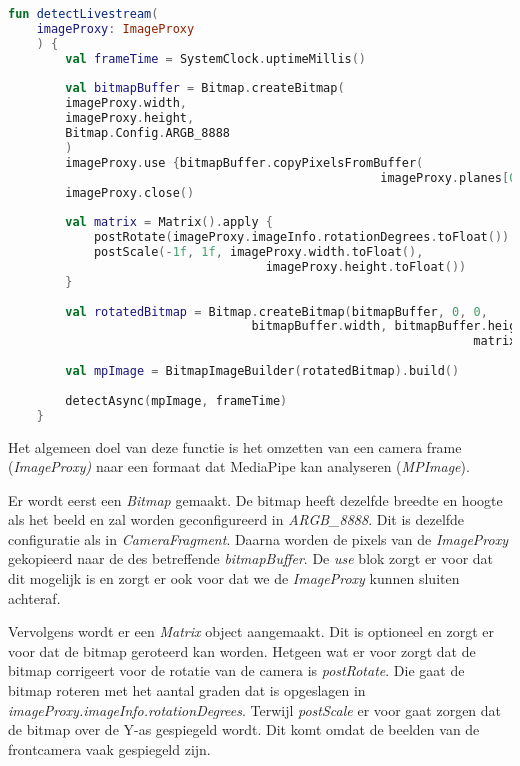 \begin{lstlisting}[language=Kotlin, caption=detectLivestream in FaceLandmarkerHelper.kt, label={lst:detectLivestream}]
    fun detectLivestream(
    imageProxy: ImageProxy
    ) {
        val frameTime = SystemClock.uptimeMillis()
        
        val bitmapBuffer = Bitmap.createBitmap(
        imageProxy.width,
        imageProxy.height,
        Bitmap.Config.ARGB_8888
        )
        imageProxy.use {bitmapBuffer.copyPixelsFromBuffer(
                                                    imageProxy.planes[0].buffer)}
        imageProxy.close()
        
        val matrix = Matrix().apply {
            postRotate(imageProxy.imageInfo.rotationDegrees.toFloat())
            postScale(-1f, 1f, imageProxy.width.toFloat(),
                                    imageProxy.height.toFloat())
        }
        
        val rotatedBitmap = Bitmap.createBitmap(bitmapBuffer, 0, 0,
                                  bitmapBuffer.width, bitmapBuffer.height,
                                                                 matrix, true)
        
        val mpImage = BitmapImageBuilder(rotatedBitmap).build()
        
        detectAsync(mpImage, frameTime)
    }
\end{lstlisting}
Het algemeen doel van deze functie is het omzetten van een camera frame (\emph{ImageProxy)} naar een formaat dat MediaPipe kan analyseren (\emph{MPImage}).

Er wordt eerst een \emph{Bitmap} gemaakt. De bitmap heeft dezelfde breedte en hoogte als het beeld en zal worden geconfigureerd in \emph{ARGB\_8888}. Dit is dezelfde configuratie als in \emph{CameraFragment}. Daarna worden de pixels van de \emph{ImageProxy} gekopieerd naar de des betreffende \emph{bitmapBuffer}. De \emph{use} blok zorgt er voor dat dit mogelijk is en zorgt er ook voor dat we de \emph{ImageProxy} kunnen sluiten achteraf.

Vervolgens wordt er een \emph{Matrix} object aangemaakt. Dit is optioneel en zorgt er voor dat de bitmap geroteerd kan worden. Hetgeen wat er voor zorgt dat de bitmap corrigeert voor de rotatie van de camera is \emph{postRotate}. Die gaat de bitmap roteren met het aantal graden dat is opgeslagen in \emph{imageProxy.imageInfo.rotationDegrees}. Terwijl \emph{postScale} er voor gaat zorgen dat de bitmap over de Y-as gespiegeld wordt. Dit komt omdat de beelden van de frontcamera vaak gespiegeld zijn.

